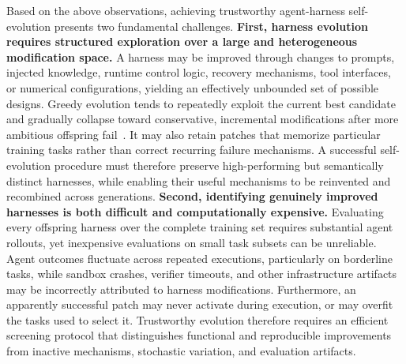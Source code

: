 Based on the above observations, achieving trustworthy agent-harness self-evolution presents two fundamental challenges. 
%
\textbf{First, harness evolution requires structured exploration over a large and heterogeneous modification space.}
%
A harness may be improved through changes to prompts, injected knowledge, runtime control logic, recovery mechanisms, tool interfaces, or numerical configurations, yielding an effectively unbounded set of possible designs.
%
Greedy evolution tends to repeatedly exploit the current best candidate and gradually collapse toward conservative, incremental modifications after more ambitious offspring fail~\citep{ursekar2026vero}.
%
It may also retain patches that memorize particular training tasks rather than correct recurring failure mechanisms.
%
A successful self-evolution procedure must therefore preserve high-performing but semantically distinct harnesses, while enabling their useful mechanisms to be reinvented and recombined across generations.
%
\textbf{Second, identifying genuinely improved harnesses is both difficult and computationally expensive.}
%
Evaluating every offspring harness over the complete training set requires substantial agent rollouts, yet inexpensive evaluations on small task subsets can be unreliable.
%
Agent outcomes fluctuate across repeated executions, particularly on borderline tasks, while sandbox crashes, verifier timeouts, and other infrastructure artifacts may be incorrectly attributed to harness modifications.
%
Furthermore, an apparently successful patch may never activate during execution, or may overfit the tasks used to select it.
%
Trustworthy evolution therefore requires an efficient screening protocol that distinguishes functional and reproducible improvements from inactive mechanisms, stochastic variation, and evaluation artifacts.


